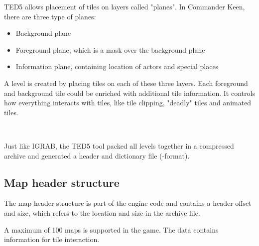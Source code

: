 \documentclass[book.tex]{subfiles}
\begin{document}
 \par
TED5 allows placement of tiles on layers called "planes". In Commander Keen, there are three type of planes:
\begin{itemize}
  \item Background plane
  \item Foreground plane, which is a mask over the background plane
  \item Information plane, containing location of actors and special places
\end{itemize}
A level is created by placing tiles on each of these three layers. Each foreground and background tile could be enriched with additional tile information. It controls how everything interacts with tiles, like tile clipping, "deadly" tiles and animated tiles. \\

 \par
{}\\
 
 \par

Just like IGRAB, the TED5 tool packed all levels together in a compressed  archive and generated a header and dictionary file (-format). \\
 
\subsection{Map header structure}
The map header structure is part of the engine code and contains a header offset and size, which refers to the location and size in the  archive file. \\

\par
\begin{minipage}{\textwidth}
 \par
 \end{minipage}

A maximum of 100 maps is supported in the game. The  data contains information for tile interaction. 
\end{document}

